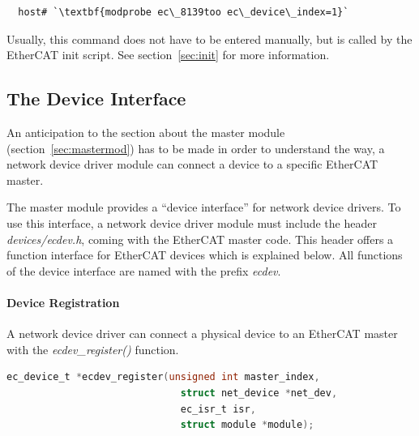 \documentclass[a4paper,12pt,BCOR6mm,bibtotoc,idxtotoc]{scrbook}
\begin{document}
\begin{lstlisting}
  host# `\textbf{modprobe ec\_8139too ec\_device\_index=1}`
\end{lstlisting}

Usually, this command does not have to be entered manually, but is
called by the EtherCAT init script. See section~\ref{sec:init} for
more information.


\subsection{The Device Interface}
\label{sec:ecdev}

An anticipation to the section about the master module
(section~\ref{sec:mastermod}) has to be made in order to understand
the way, a network device driver module can connect a device to a
specific EtherCAT master.

The master module provides a ``device interface'' for network device
drivers. To use this interface, a network device driver module must
include the header
\textit{devices/ecdev.h}, coming
with the EtherCAT master code. This header offers a function interface
for EtherCAT devices which is explained below. All functions of the
device interface are named with the prefix \textit{ecdev}.

\paragraph{Device Registration}

A network device driver can connect a physical device to an EtherCAT
master with the \textit{ecdev\_register()} function.

\begin{lstlisting}[language=C]
  ec_device_t *ecdev_register(unsigned int master_index,
                              struct net_device *net_dev,
                              ec_isr_t isr,
                              struct module *module);
\end{lstlisting}
\end{document}
